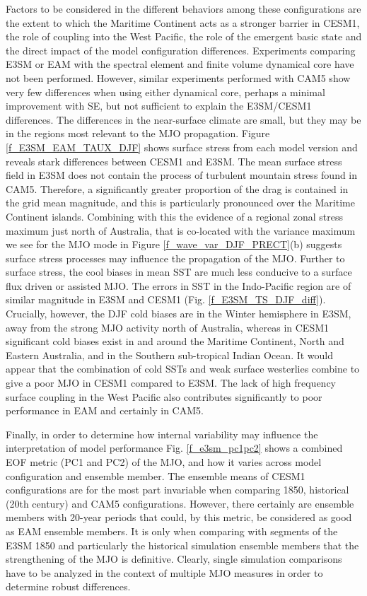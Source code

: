 \documentclass[draft,ms]{AGUTeX}
\begin{document}
\begin{article}
Factors to be considered in the different behaviors among these configurations are the extent to which the Maritime Continent acts as a stronger barrier in CESM1, the role of coupling into the West Pacific, the role of the emergent basic state and the direct impact of the model configuration differences. Experiments comparing E3SM or EAM with the spectral element and finite volume dynamical core have not been performed. However, similar experiments performed with CAM5 show very few differences when using either dynamical core, perhaps a minimal improvement with SE, but not sufficient to explain the E3SM/CESM1 differences. The differences in the near-surface climate are small, but they may be in the regions most relevant to the MJO propagation. Figure \ref{f_E3SM_EAM_TAUX_DJF} shows surface stress from each model version and reveals stark differences between CESM1 and E3SM. The mean surface stress field in E3SM does not contain the process of turbulent mountain stress found in CAM5. Therefore, a significantly greater proportion of the drag is contained in the grid mean magnitude, and this is particularly pronounced over the Maritime Continent islands. Combining with this the evidence of a regional zonal stress maximum just north of Australia, that is co-located with the variance maximum we see for the MJO mode in Figure \ref{f_wave_var_DJF_PRECT}(b) suggests surface stress processes may influence the propagation of the MJO. Further to surface stress, the cool biases in mean SST are much less conducive to a surface flux driven or assisted MJO. The errors in SST in the Indo-Pacific region are of similar magnitude in E3SM and CESM1 (Fig. \ref{f_E3SM_TS_DJF_diff}). Crucially, however, the DJF cold biases are in the Winter hemisphere in E3SM, away from the strong MJO activity north of Australia, whereas in CESM1 significant cold biases exist in and around the Maritime Continent, North and Eastern Australia, and in the Southern sub-tropical Indian Ocean. It would appear that the combination of cold SSTs and weak surface westerlies combine to give a poor MJO in CESM1 compared to E3SM. The lack of high frequency surface coupling in the West Pacific also contributes significantly to poor performance in EAM and certainly in CAM5.

Finally, in order to determine how internal variability may influence the interpretation of model performance Fig. \ref{f_e3sm_pc1pc2} shows a combined EOF metric (PC1 and PC2) of the MJO, and how it varies across model configuration and ensemble member. The ensemble means of CESM1 configurations are for the most part invariable when comparing 1850, historical (20th century) and CAM5 configurations. However, there certainly are ensemble members with 20-year periods that could, by this metric, be considered as good as EAM ensemble members. It is only when comparing with segments of the E3SM 1850 and particularly the historical simulation ensemble members that the strengthening of the MJO is definitive. Clearly, single simulation comparisons have to be analyzed in the context of multiple MJO measures in order to determine robust differences.


\end{article}
\end{document}
